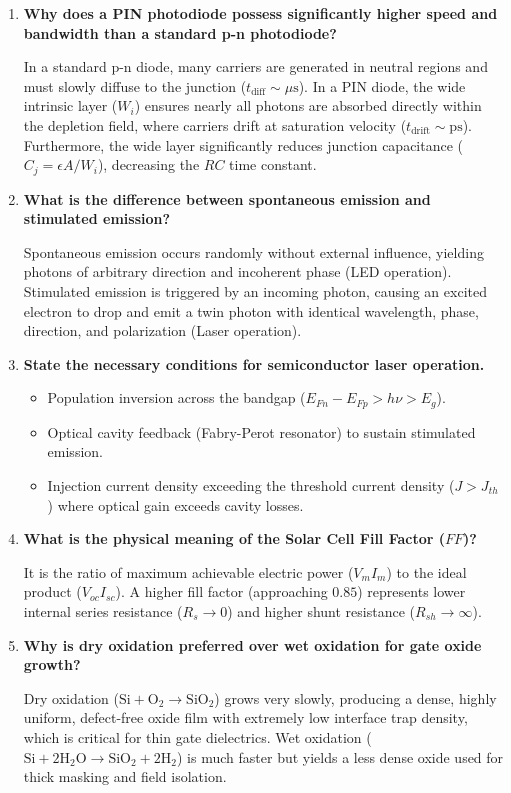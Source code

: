 \documentclass[12pt,a4paper]{article}
\newcommand{\Q}[1]{\textbf{#1}\par\noindent\ignorespaces}
\begin{document}
\begin{tcolorbox}[exambox, title={\textbf{Frequently Asked / Viva Questions}}]
\begin{enumerate}[topsep=0pt, label=\textbf{Q\arabic*.}, itemsep=5pt]
  \item \Q{Why does a PIN photodiode possess significantly higher speed and bandwidth than a standard p-n photodiode?}
    In a standard p-n diode, many carriers are generated in neutral regions and must slowly diffuse to the junction ($t_{\text{diff}} \sim \mu\text{s}$). In a PIN diode, the wide intrinsic layer ($W_i$) ensures nearly all photons are absorbed directly within the depletion field, where carriers drift at saturation velocity ($t_{\text{drift}} \sim \text{ps}$). Furthermore, the wide layer significantly reduces junction capacitance ($C_j = \epsilon A / W_i$), decreasing the $RC$ time constant.
  \item \Q{What is the difference between spontaneous emission and stimulated emission?}
    Spontaneous emission occurs randomly without external influence, yielding photons of arbitrary direction and incoherent phase (LED operation). Stimulated emission is triggered by an incoming photon, causing an excited electron to drop and emit a twin photon with identical wavelength, phase, direction, and polarization (Laser operation).
  \item \Q{State the necessary conditions for semiconductor laser operation.}
    \begin{itemize}[leftmargin=*, itemsep=1pt, topsep=2pt]
      \item Population inversion across the bandgap ($E_{Fn} - E_{Fp} > h\nu > E_g$).
      \item Optical cavity feedback (Fabry-Perot resonator) to sustain stimulated emission.
      \item Injection current density exceeding the threshold current density ($J > J_{th}$) where optical gain exceeds cavity losses.
    \end{itemize}
  \item \Q{What is the physical meaning of the Solar Cell Fill Factor ($FF$)?}
    It is the ratio of maximum achievable electric power ($V_m I_m$) to the ideal product ($V_{oc} I_{sc}$). A higher fill factor (approaching $0.85$) represents lower internal series resistance ($R_s \to 0$) and higher shunt resistance ($R_{sh} \to \infty$).
  \item \Q{Why is dry oxidation preferred over wet oxidation for gate oxide growth?}
    Dry oxidation ($\text{Si} + \text{O}_2 \to \text{SiO}_2$) grows very slowly, producing a dense, highly uniform, defect-free oxide film with extremely low interface trap density, which is critical for thin gate dielectrics. Wet oxidation ($\text{Si} + 2\text{H}_2\text{O} \to \text{SiO}_2 + 2\text{H}_2$) is much faster but yields a less dense oxide used for thick masking and field isolation.

\end{enumerate}
\end{tcolorbox}
\end{document}
